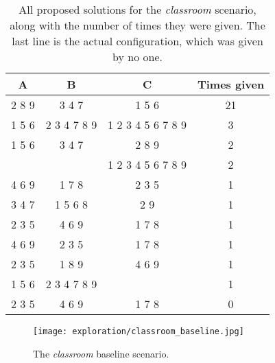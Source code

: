 \clearpage

\begin{table}
    \centering
    \begin{tabular}{|c|c|c|c|} 
    \hline
    A     & B       & C                     & Times given \\
    \hline
    2 8 9 & 3 4 7       & 1 5 6             & 21     \\
    1 5 6 & 2 3 4 7 8 9 & 1 2 3 4 5 6 7 8 9 &  3     \\
    1 5 6 & 3 4 7       & 2 8 9             &  2     \\
          &             & 1 2 3 4 5 6 7 8 9 &  2     \\
    4 6 9 & 1 7 8       & 2 3 5             &  1     \\
    3 4 7 & 1 5 6 8     & 2 9               &  1     \\
    2 3 5 & 4 6 9       & 1 7 8             &  1     \\
    4 6 9 & 2 3 5       & 1 7 8             &  1     \\
    2 3 5 & 1 8 9       & 4 6 9             &  1     \\
    1 5 6 & 2 3 4 7 8 9 &                   &  1     \\
    \hline
    2 3 5 & 4 6 9       & 1 7 8             &  0     \\
    \hline
\end{tabular}
\caption{All proposed solutions for the \textit{classroom} scenario, along with the number of times they were given. The last line is the actual configuration, which was given by no one.}
\label{table:classroom_answers}
\end{table}

\begin{figure}
    \centering
    \texttt{[image: exploration/classroom\_baseline.jpg]}
    \caption{The \textit{classroom} baseline scenario.}
    \label{fig:explor:classroom_baseline_again}
\end{figure}

\clearpage

